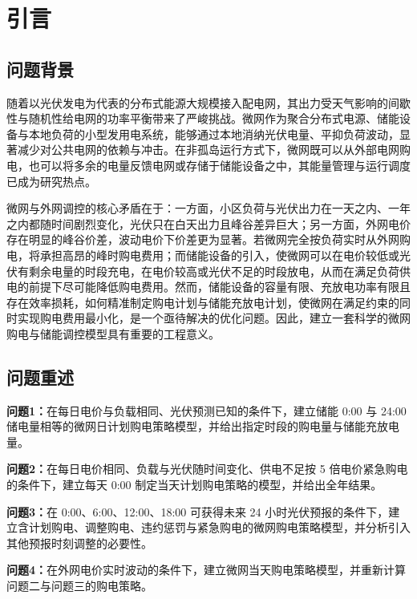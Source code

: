 
\section{引言}
\subsection{问题背景}

随着以光伏发电为代表的分布式能源大规模接入配电网，其出力受天气影响的间歇性与随机性给电网的功率平衡带来了严峻挑战。微网作为聚合分布式电源、储能设备与本地负荷的小型发用电系统\cite{lasseter2002}，能够通过本地消纳光伏电量、平抑负荷波动，显著减少对公共电网的依赖与冲击。在非孤岛运行方式下，微网既可以从外部电网购电，也可以将多余的电量反馈电网或存储于储能设备之中，其能量管理与运行调度已成为研究热点\cite{kanchev2011}。

微网与外网调控的核心矛盾在于：一方面，小区负荷与光伏出力在一天之内、一年之内都随时间剧烈变化，光伏只在白天出力且峰谷差异巨大；另一方面，外网电价存在明显的峰谷价差，波动电价下价差更为显著。若微网完全按负荷实时从外网购电，将承担高昂的峰时购电费用；而储能设备的引入，使微网可以在电价较低或光伏有剩余电量的时段充电，在电价较高或光伏不足的时段放电，从而在满足负荷供电的前提下尽可能降低购电费用。然而，储能设备的容量有限、充放电功率有限且存在效率损耗，如何精准制定购电计划与储能充放电计划，使微网在满足约束的同时实现购电费用最小化，是一个亟待解决的优化问题。因此，建立一套科学的微网购电与储能调控模型具有重要的工程意义。

\subsection{问题重述}

\textbf{问题1：}在每日电价与负载相同、光伏预测已知的条件下，建立储能 0:00 与 24:00 储电量相等的微网日计划购电策略模型，并给出指定时段的购电量与储能充放电量。

\textbf{问题2：}在每日电价相同、负载与光伏随时间变化、供电不足按 5 倍电价紧急购电的条件下，建立每天 0:00 制定当天计划购电策略的模型，并给出全年结果。

\textbf{问题3：}在 0:00、6:00、12:00、18:00 可获得未来 24 小时光伏预报的条件下，建立含计划购电、调整购电、违约惩罚与紧急购电的微网购电策略模型，并分析引入其他预报时刻调整的必要性。

\textbf{问题4：}在外网电价实时波动的条件下，建立微网当天购电策略模型，并重新计算问题二与问题三的购电策略。
